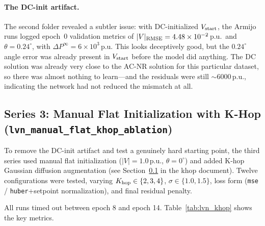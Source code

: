 \documentclass{article}
\begin{document}
\paragraph{The DC-init artifact.}
The second folder revealed a subtler issue: with DC-initialized
$V_{\rm start}$, the Armijo runs logged epoch~0 validation metrics of
$|V|_{\rm RMSE} = 4.48\times10^{-2}$\,p.u.\ and $\theta = 0.24^\circ$,
with $\Delta P^\infty = 6\times10^3$\,p.u.  This looks deceptively good,
but the $0.24^\circ$ angle error was already present in $V_{\rm start}$
before the model did anything.  The DC solution was already very close to
the AC-NR solution for this particular dataset, so there was almost nothing
to learn---and the residuals were still $\sim6000$\,p.u., indicating the
network had not reduced the mismatch at all.

\subsection{Series 3: Manual Flat Initialization with K-Hop
  (\texttt{lvn\_manual\_flat\_khop\_ablation})}

To remove the DC-init artifact and test a genuinely hard starting point,
the third series used manual flat initialization ($|V|=1.0$\,p.u.,
$\theta=0^\circ$) and added K-hop Gaussian diffusion augmentation (see
Section~\ref{} in the khop document).  Twelve configurations were tested,
varying $K_{\rm hop} \in \{2, 3, 4\}$, $\sigma \in \{1.0, 1.5\}$, loss
form (\texttt{mse} / \texttt{huber}+setpoint normalization), and final
residual penalty.

All runs timed out between epoch 8 and epoch 14.
Table~\ref{tab:lvn_khop} shows the key metrics.
\end{document}
